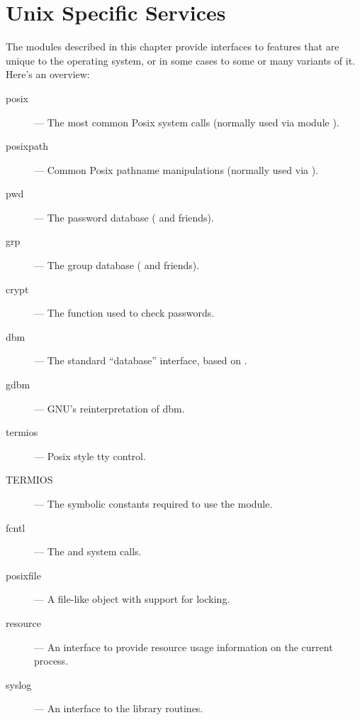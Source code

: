 \chapter{Unix Specific Services}

The modules described in this chapter provide interfaces to features
that are unique to the \UNIX{} operating system, or in some cases to
some or many variants of it.  Here's an overview:

\begin{description}

\item[posix]
--- The most common Posix system calls (normally used via module ).

\item[posixpath]
--- Common Posix pathname manipulations (normally used via ).

\item[pwd]
--- The password database ( and friends).

\item[grp]
--- The group database ( and friends).

\item[crypt]
--- The  function used to check \UNIX{} passwords.

\item[dbm]
--- The standard ``database'' interface, based on .

\item[gdbm]
--- GNU's reinterpretation of dbm.

\item[termios]
--- Posix style tty control.

\item[TERMIOS]
--- The symbolic constants required to use the  module.

\item[fcntl]
--- The  and  system calls.

\item[posixfile]
--- A file-like object with support for locking.

\item[resource]
--- An interface to provide resource usage information on the current
process.

\item[syslog]
--- An interface to the \UNIX{}  library routines.

\end{description}
